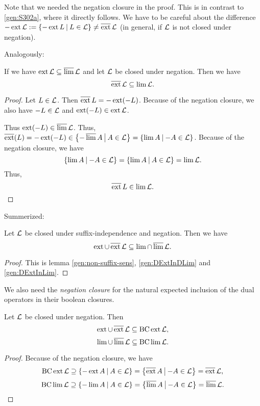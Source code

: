 Note that we needed the negation closure in the proof. This is in contrast to \ref{gen:S302a}, where it directly follows. We have to be careful about the difference $- \ext \Lang := \Set{-\ext L}{L \in \Lang} \neq \dext \Lang$ (in general, if $\mathcal{L}$ is not closed under negation).

Analogously:

\begin{lemma}
\label{gen:DExtInLim}
If we have $\operatorname{ext} \mathcal{L} \subseteq \operatorname{\overline{lim}} \mathcal{L}$ and let $\mathcal{L}$ be closed under negation. Then we have
\[ \operatorname{\overline{ext}} \mathcal{L} \subseteq \lim \mathcal{L} . \]
\begin{proof}
Let $L \in \mathcal{L}$. Then $ \operatorname{\overline{ext}} L = - \operatorname{ext} (-L) $. Because of the negation closure, we also have $-L \in \mathcal{L}$ and $\operatorname{ext}(-L) \in \operatorname{ext} \mathcal{L}$.

Thus $\operatorname{ext}(-L) \in \operatorname{\overline{lim}} \mathcal{L}$. Thus, $\dext(L) = -\ext(-L) \in \Set{-\dlim A}{A \in \Lang} = \Set{\lim A}{-A \in \Lang}$. Because of the negation closure, we have
\[ \Set{\lim A}{-A \in \Lang} = \Set{\lim A}{A \in \Lang} = \lim \Lang . \]
Thus,
\[ \operatorname{\overline{ext}} L \in \lim \mathcal{L} . \]
\end{proof}
\end{lemma}

Summerized:

\begin{lemma}
Let $\mathcal{L}$ be closed under suffix-independence and negation. Then we have
\[ \operatorname{ext} \cup \operatorname{\overline{ext}} \mathcal{L} \subseteq \lim \cap \operatorname{\overline{lim}} \mathcal{L} . \]
\begin{proof}
This is lemma \ref{gen:non-suffix-sens}, \ref{gen:DExtInDLim} and \ref{gen:DExtInLim}.
\end{proof}
\end{lemma}

We also need the \emph{negation closure} for the natural expected inclusion of the dual operators in their boolean closures.

\begin{lemma}
\label{gen:opinBCop}
Let $\mathcal{L}$ be closed under negation. Then
\[ \operatorname{ext} \cup \operatorname{\overline{ext}} \mathcal{L} \subseteq \operatorname{BC} \operatorname{ext} \mathcal{L} , \]
\[ \lim \cup \operatorname{\overline{lim}} \mathcal{L} \subseteq \operatorname{BC} \lim \mathcal{L} . \]
\begin{proof}
Because of the negation closure, we have
\[ \BC \ext \Lang \supseteq \Set{-\ext A}{A \in \Lang} = \Set{\dext A}{-A \in \Lang} = \dext \Lang , \]
\[ \BC \lim \Lang \supseteq \Set{-\lim A}{A \in \Lang} = \Set{\dlim A}{-A \in \Lang} = \dlim \Lang . \]
\end{proof}
\end{lemma}

